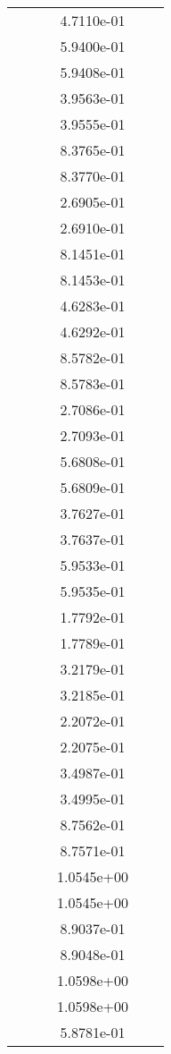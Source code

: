 \begin{xltabular}{\textwidth}{r|rS[table-format=1.3e+2]S[table-format=1.4e+2]S[table-format=1.4e+2]S[table-format=-1.5]}
&  &  & 4.7110e-01 & & \\
&  &  & 5.9400e-01 & & \\
&  &  & 5.9408e-01 & & \\
&  &  & 3.9563e-01 & & \\
&  &  & 3.9555e-01 & & \\
&  &  & 8.3765e-01 & & \\
&  &  & 8.3770e-01 & & \\
&  &  & 2.6905e-01 & & \\
&  &  & 2.6910e-01 & & \\
&  &  & 8.1451e-01 & & \\
&  &  & 8.1453e-01 & & \\
&  &  & 4.6283e-01 & & \\
&  &  & 4.6292e-01 & & \\
&  &  & 8.5782e-01 & & \\
&  &  & 8.5783e-01 & & \\
&  &  & 2.7086e-01 & & \\
&  &  & 2.7093e-01 & & \\
&  &  & 5.6808e-01 & & \\
&  &  & 5.6809e-01 & & \\
&  &  & 3.7627e-01 & & \\
&  &  & 3.7637e-01 & & \\
&  &  & 5.9533e-01 & & \\
&  &  & 5.9535e-01 & & \\
&  &  & 1.7792e-01 & & \\
&  &  & 1.7789e-01 & & \\
&  &  & 3.2179e-01 & & \\
&  &  & 3.2185e-01 & & \\
&  &  & 2.2072e-01 & & \\
&  &  & 2.2075e-01 & & \\
&  &  & 3.4987e-01 & & \\
&  &  & 3.4995e-01 & & \\
&  &  & 8.7562e-01 & & \\
&  &  & 8.7571e-01 & & \\
&  &  & 1.0545e+00 & & \\
&  &  & 1.0545e+00 & & \\
&  &  & 8.9037e-01 & & \\
&  &  & 8.9048e-01 & & \\
&  &  & 1.0598e+00 & & \\
&  &  & 1.0598e+00 & & \\
&  &  & 5.8781e-01 & & \\

\end{xltabular}
